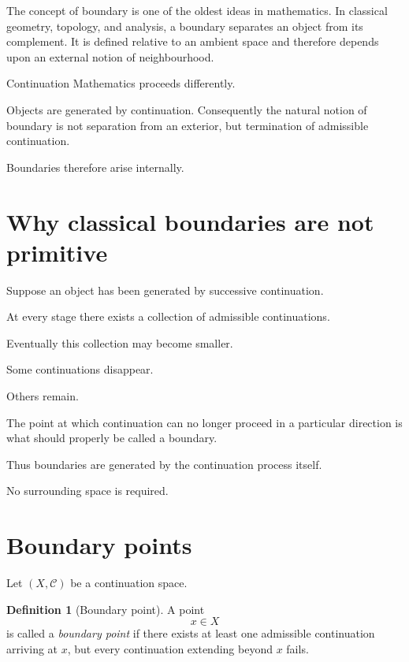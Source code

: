 \documentclass[13pt,openany]{book}
\theoremstyle{plain}
\theoremstyle{definition}
\newtheorem{definition}{Definition}[chapter]
\begin{document}
The concept of boundary is one of the oldest ideas in mathematics. In classical geometry, topology, and analysis, a boundary separates an object from its complement. It is defined relative to an ambient space and therefore depends upon an external notion of neighbourhood.

Continuation Mathematics proceeds differently.

Objects are generated by continuation. Consequently the natural notion of boundary is not separation from an exterior, but termination of admissible continuation.

Boundaries therefore arise internally.

\section{Why classical boundaries are not primitive}

Suppose an object has been generated by successive continuation.

At every stage there exists a collection of admissible continuations.

Eventually this collection may become smaller.

Some continuations disappear.

Others remain.

The point at which continuation can no longer proceed in a particular direction is what should properly be called a boundary.

Thus boundaries are generated by the continuation process itself.

No surrounding space is required.

\section{Boundary points}

Let $(X,\mathcal C)$ be a continuation space.

\begin{definition}[Boundary point]
A point
\[
x\in X
\]
is called a \emph{boundary point} if there exists at least one admissible continuation arriving at $x$, but every continuation extending beyond $x$ fails.
\end{definition}
\end{document}
